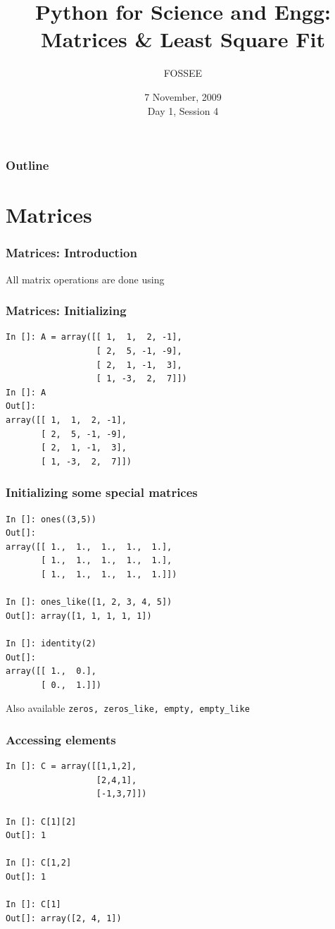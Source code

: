 \documentclass[14pt,compress]{beamer}
\title[Matrices \& Curve Fitting]{Python for Science and Engg: Matrices \& Least Square Fit}
\author[FOSSEE] {FOSSEE}
\institute[IIT Bombay] {Department of Aerospace Engineering\\IIT Bombay}
\date[] {7 November, 2009\\Day 1, Session 4}
\newcommand{\typ}[1]{\lstinline{#1}}
\newcommand{\kwrd}[1]{ \texttt{\textbf{\color{blue}{#1}}}  }
\begin{document}
\begin{frame}
  \titlepage
\end{frame}

\begin{frame}
  \frametitle{Outline}
  \tableofcontents
\end{frame}

\section{Matrices}

\begin{frame}
\frametitle{Matrices: Introduction}
\alert{All matrix operations are done using \kwrd{arrays}}
\end{frame}

\begin{frame}[fragile]
\frametitle{Matrices: Initializing}
\begin{lstlisting}
In []: A = array([[ 1,  1,  2, -1],
                  [ 2,  5, -1, -9],
                  [ 2,  1, -1,  3],
                  [ 1, -3,  2,  7]])
In []: A
Out[]: 
array([[ 1,  1,  2, -1],
       [ 2,  5, -1, -9],
       [ 2,  1, -1,  3],
       [ 1, -3,  2,  7]])
\end{lstlisting}
\end{frame}

\begin{frame}[fragile]
\frametitle{Initializing some special matrices}
\begin{small}
  \begin{lstlisting}
In []: ones((3,5))
Out[]: 
array([[ 1.,  1.,  1.,  1.,  1.],
       [ 1.,  1.,  1.,  1.,  1.],
       [ 1.,  1.,  1.,  1.,  1.]])

In []: ones_like([1, 2, 3, 4, 5]) 
Out[]: array([1, 1, 1, 1, 1])   

In []: identity(2)
Out[]: 
array([[ 1.,  0.],
       [ 0.,  1.]])
  \end{lstlisting}
Also available \alert{\typ{zeros, zeros_like, empty, empty_like}}
\end{small}
\end{frame}


\begin{frame}[fragile]
  \frametitle{Accessing elements}
  \begin{lstlisting}
In []: C = array([[1,1,2],
                  [2,4,1],
                  [-1,3,7]])

In []: C[1][2]
Out[]: 1

In []: C[1,2]
Out[]: 1

In []: C[1]
Out[]: array([2, 4, 1])
  \end{lstlisting}
\end{frame}
\end{document}
